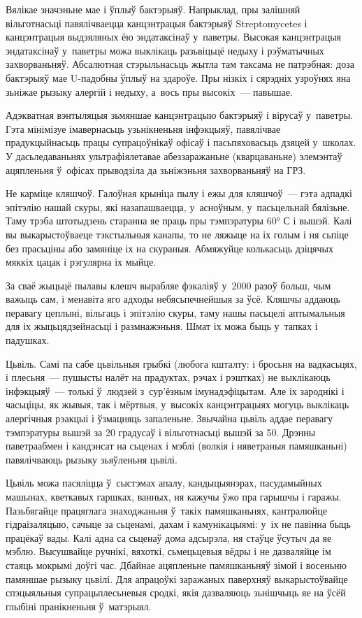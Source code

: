 Вялікае значэньне мае і ўплыў бактэрыяў. Напрыклад, пры залішняй вільготнасьці павялічваецца канцэнтрацыя бактэрыяў Streptomycetes і канцэнтрацыя выдзяляных ёю эндатаксінаў у~паветры. Высокая канцэнтрацыя эндатаксінаў у~паветры можа выклікаць разьвіцьцё недыху і рэўматычных захворваньняў. Абсалютная стэрыльнасьць жытла там таксама не патрэбная: доза бактэрыяў мае U-падобны ўплыў на здароўе. Пры нізкіх і сярэдніх узроўнях яна зьніжае рызыку алергій і недыху, а~вось пры высокіх~--- павышае.

Адэкватная вэнтыляцыя зьмяншае канцэнтрацыю бактэрыяў і вірусаў у~паветры. Гэта мінімізуе імавернасьць узьнікненьня інфэкцыяў, павялічвае прадукцыйнасьць працы супрацоўнікаў офісаў і пасьпяховасьць дзяцей у~школах. У дасьледаваньнях ультрафіялетавае абеззаражаньне (кварцаваньне) элемэнтаў ацяпленьня ў~офісах прыводзіла да зьніжэньня захворваньняў на ГРЗ.

Не карміце кляшчоў. Галоўная крыніца пылу і ежы для кляшчоў~--- гэта адпадкі эпітэлію нашай скуры, які назапашваецца, у~асноўным, у~пасьцельнай бялізьне. Таму трэба штотыдзень старанна яе праць пры тэмпэратуры 60° С і вышэй. Калі вы выкарыстоўваеце тэкстыльныя канапы, то не ляжыце на іх голым і ня сьпіце без прасьціны або замяніце іх на скураныя. Абмяжуйце колькасьць дзіцячых мяккіх цацак і рэгулярна іх мыйце.

За сваё жыцьцё пылавы клешч вырабляе фэкаліяў у~2000 разоў больш, чым важыць сам, і менавіта яго адходы небясьпечнейшыя за ўсё. Кляшчы аддаюць перавагу цеплыні, вільгаць і эпітэлію скуры, таму нашы пасьцелі аптымальныя для іх жыцьцядзейнасьці і размнажэньня. Шмат іх можа быць у~тапках і падушках.

Цьвіль. Самі па сабе цьвільныя грыбкі (любога кшталту: і бросьня на вадкасьцях, і плесьня~--- пушысты налёт на прадуктах, рэчах і рэштках) не выклікаюць інфэкцыяў~--- толькі ў~людзей з~сур'ёзным імунадэфіцытам. Але іх зароднікі і часьціцы, як жывыя, так і мёртвыя, у~высокіх канцэнтрацыях могуць выклікаць алергічныя рэакцыі і ўзмацняць запаленьне. Звычайна цьвіль аддае перавагу тэмпэратуры вышэй за 20 градусаў і вільготнасьці вышэй за 50. Дрэнны паветраабмен і кандэнсат на сьценах і мэблі (волкія і няветраныя памяшканьні) павялічваюць рызыку зьяўленьня цьвілі.

Цьвіль можа пасяліцца ў~сыстэмах апалу, кандыцыянэрах, пасудамыйных машынах, кветкавых гаршках, ванных, ня кажучы ўжо пра гарышчы і гаражы. Пазьбягайце працяглага знаходжаньня ў~такіх памяшканьнях, кантралюйце гідраізаляцыю, сачыце за сьценамі, дахам і камунікацыямі: у~іх не павінна быць працёкаў вады. Калі адна са сьценаў дома адсырэла, ня стаўце ўсутыч да яе мэблю. Высушвайце ручнікі, вяхоткі, сьмецьцевыя вёдры і не дазваляйце ім стаяць мокрымі доўгі час. Дбайнае ацяпленьне памяшканьняў зімой і восеньню памяншае рызыку цьвілі. Для апрацоўкі заражаных паверхняў выкарыстоўвайце спэцыяльныя супрацьплесьневыя сродкі, якія дазваляюць зьнішчыць яе на ўсёй глыбіні пранікненьня ў~матэрыял.

